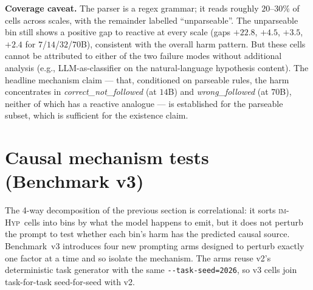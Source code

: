 \documentclass[11pt]{article}
\newcommand{\imhyp}{\textsc{im-Hyp}}
\begin{document}
\textbf{Coverage caveat.}  The parser is a regex grammar; it
reads roughly $20$--$30\%$ of cells across scales, with the
remainder labelled ``unparseable''.  The unparseable bin still
shows a positive gap to reactive at every scale (gaps $+22.8$,
$+4.5$, $+3.5$, $+2.4$ for $7$/$14$/$32$/$70$B), consistent with
the overall harm pattern.  But these cells cannot be attributed
to either of the two failure modes without additional analysis
(e.g., LLM-as-classifier on the natural-language hypothesis
content).  The headline mechanism claim --- that, conditioned on
parseable rules, the harm concentrates in
\textit{correct\_not\_followed} (at $14$B) and \textit{wrong\_followed}
(at $70$B), neither of which has a reactive analogue --- is
established for the parseable subset, which is sufficient for the
existence claim.

\section{Causal mechanism tests (Benchmark v3)}
\label{sec:bench3}

The 4-way decomposition of the previous section is correlational:
it sorts \imhyp\ cells into bins by what the model happens to
emit, but it does not perturb the prompt to test whether each
bin's harm has the predicted causal source.  Benchmark~v3
introduces four new prompting arms designed to perturb
exactly one factor at a time and so isolate the mechanism.  The
arms reuse v2's deterministic task generator with the same
\verb|--task-seed=2026|, so v3 cells join task-for-task
seed-for-seed with v2.
\end{document}
